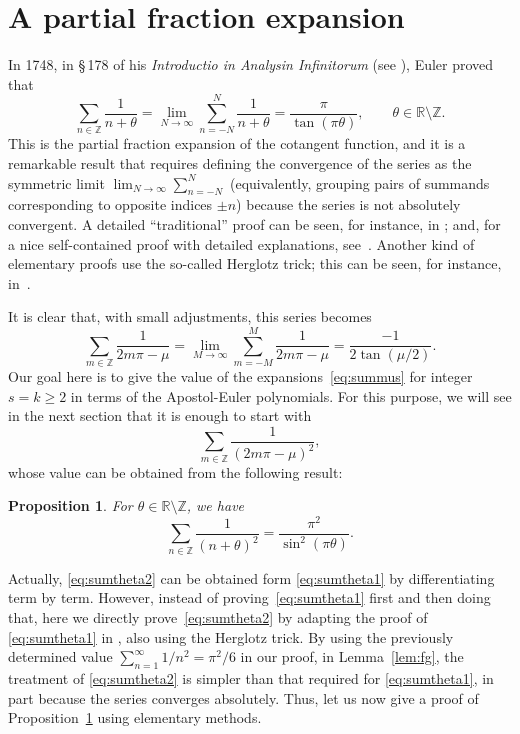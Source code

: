 \documentclass[11pt, oneside]{article}
\newcommand{\Z}{\mathbb{Z}}
\newcommand{\R}{\mathbb{R}}
\theoremstyle{plain}
\newtheorem{proposition}[theorem]{Proposition}
\theoremstyle{definition}
\begin{document}
\section{A partial fraction expansion}
\label{sec:parfrac}

In 1748, in \S\,178 of his \textit{Introductio in Analysin Infinitorum} (see \cite{Eu-fac}), Euler proved that
\begin{equation}
\label{eq:sumtheta1}
\sum_{n\in\Z} \frac{1}{n+\theta} 
= \lim_{N \to \infty} \sum_{n=-N}^N \frac{1}{n+\theta} = \frac{\pi}{\tan(\pi\theta)},
\qquad \theta \in \R \setminus \Z.
\end{equation}
This is the partial fraction expansion of the cotangent function, and it is a remarkable result that requires defining the convergence of the series as the symmetric limit $\lim_{N \to \infty} \sum_{n=-N}^N$ (equivalently, grouping pairs of summands corresponding to opposite indices $\pm n$) because the series is not absolutely convergent. A detailed ``traditional'' proof can be seen, for instance, in \cite[\S\,24, equation 117]{Kn}; and, for a nice self-contained proof with detailed explanations, see~\cite{Hof}. Another kind of elementary proofs use the so-called Herglotz trick; this can be seen, for instance, in~\cite{AiZi-cot}.

It is clear that, with small adjustments, this series becomes
\begin{equation}
\label{eq:summu1}
\sum_{m\in\Z} \frac{1}{2m\pi-\mu} 
= \lim_{M \to \infty} \sum_{m=-M}^M \frac{1}{2m\pi-\mu} = \frac{-1}{2\tan(\mu/2)}.
\end{equation}
Our goal here is to give the value of the expansions~\eqref{eq:summus} for integer $s=k\ge2$ in terms of the Apostol-Euler polynomials. For this purpose, we will see in the next section that it is enough to start with
\begin{equation*}
\sum_{m\in\Z} \frac{1}{(2m\pi-\mu)^2}, 
\end{equation*}
whose value can be obtained from the following result:

\begin{proposition}
\label{prop:sumtheta2}
For $\theta \in \R \setminus \Z$, we have
\begin{equation}
\label{eq:sumtheta2}
\sum_{n\in\Z} \frac{1}{(n+\theta)^2} = \frac{\pi^2}{\sin^2(\pi\theta)}.
\end{equation}
\end{proposition}

Actually, \eqref{eq:sumtheta2} can be obtained form \eqref{eq:sumtheta1} by differentiating term by term. However, instead of proving~\eqref{eq:sumtheta1} first and then doing that, here we directly prove~\eqref{eq:sumtheta2} by adapting the proof of \eqref{eq:sumtheta1} in \cite{AiZi-cot}, also using the Herglotz trick. By using the previously determined value $\sum_{n=1}^{\infty} 1/n^2 = \pi^2/6$ in our proof, in Lemma~\ref{lem:fg}, the treatment of \eqref{eq:sumtheta2} is simpler than that required for \eqref{eq:sumtheta1}, in part because the series converges absolutely. Thus, let us now give a proof of Proposition~\ref{prop:sumtheta2} using elementary methods.
\end{document}
